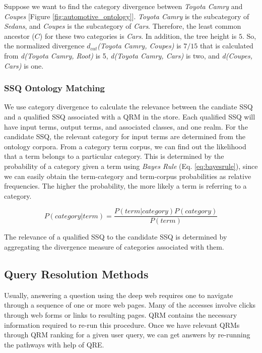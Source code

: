 Suppose we want to find the category divergence between \textit{Toyota Camry}
and \textit{Coupes} [Figure \ref{fig:automotive_ontology}]. 
\textit{Toyota Camry} is the subcategory of \textit{Sedans}, and \textit{Coupes}
is the subcategory of \textit{Cars}. Therefore, the least common ancestor ($C$)
for these two categories is \textit{Cars}. In addition, the tree height is $5$.
So, the normalized divergence $d_{cat}$\textit{(Toyota Camry, Coupes)} is $7/15$
that is calculated from \textit{d(Toyota Camry, Root)} is 5, \textit{d(Toyota
Camry, Cars)} is two, and \textit{d(Coupes, Cars)} is one.

\subsubsection{SSQ Ontology Matching}
\label{sec:oqom}

We use category divergence to calculate the relevance between the candiate SSQ
and a qualified SSQ associated with a QRM in the store. Each qualified SSQ will
have input terms, output terms, and associated classes, and one realm. For the
candidate SSQ, the relevant category for input terms are determined from the
ontology corpora. From a category term corpus, we can find out the likelihood
that a term belongs to a particular category. This is determined by the
probability of a category given a term using \textit{Bayes Rule} (Eq.
\ref{eq:bayesrule}), since we can easily obtain the term-category and
term-corpus probabilities as relative frequencies. The higher the probability,
the more likely a term is referring to a category. 

\begin{equation}
\label{eq:bayesrule}
P (category | term) = \frac{P(term | category) P(category)}{P(term)}
\end{equation}

The relevance of a qualified SSQ to the candidate SSQ is determined by
aggregating the divergence measure of categories associated with them. 

\subsection{Query Resolution Methods} 

Usually, answering a question using the 
deep web requires one to navigate through a sequence of one or 
more web pages. Many of the accesses involve clicks through 
web forms or links to resulting pages. QRM contains the necessary  
information required to re-run this procedure. Once we have 
relevant QRMs through QRM ranking for a given user query, we can  
get answers by re-running the pathways with help of QRE. 


  


